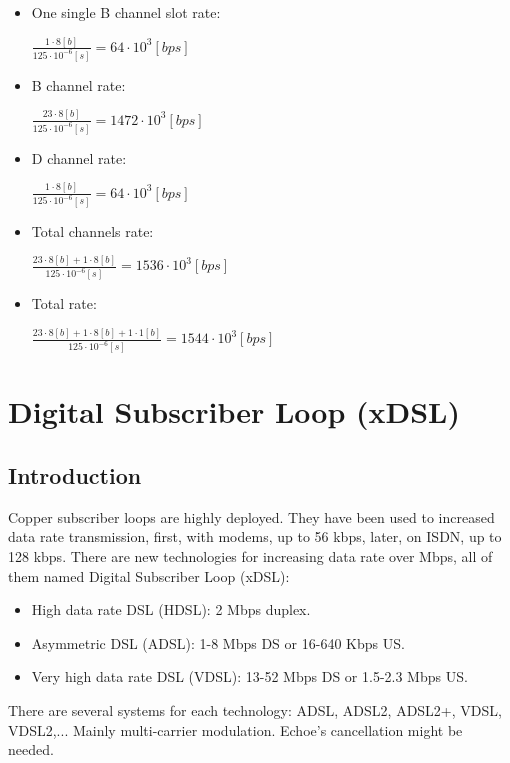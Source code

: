 \documentclass[
	12pt,
	twoside
]{book}
\begin{document}
\begin{itemize}
{\begin{itemize}
{				$
					\frac {1 \cdot 1 [b]} {125 \cdot 10^{-6} [s]} = 8 \cdot 10^3 [bps]
				$
			}
			\item {
				One single B channel slot rate:

				$
					\frac {1 \cdot 8 [b]} {125 \cdot 10^{-6} [s]} = 64 \cdot 10^3 [bps]
				$
			}
			\item {
				B channel rate:

				$
					\frac {23 \cdot 8 [b]} {125 \cdot 10^{-6} [s]} = 1472 \cdot 10^3 [bps]
				$
			}
			\item {
				D channel rate:

				$
					\frac {1 \cdot 8 [b]} {125 \cdot 10^{-6} [s]} = 64 \cdot 10^3 [bps]
				$
			}
			\item {
				Total channels rate:

				$
					\frac {23 \cdot 8 [b] + 1 \cdot 8 [b]} {125 \cdot 10^{-6} [s]} = 1536 \cdot 10^3 [bps]
				$
			}
			\item {
				Total rate:

				$
					\frac {23 \cdot 8 [b] + 1 \cdot 8 [b] + 1 \cdot 1 [b]} {125 \cdot 10^{-6} [s]} = 1544 \cdot 10^3 [bps]
				$
			}
		\end{itemize}
	}
\end{itemize}

\section{Digital Subscriber Loop (xDSL)}

\subsection{Introduction}

Copper subscriber loops are highly deployed. They have been used to increased data rate transmission, first, with modems, up to 56 kbps, later, on ISDN, up to 128 kbps. There are new technologies for increasing data rate over Mbps, all of them named Digital Subscriber Loop (xDSL):

\begin{itemize}
	\item High data rate DSL (HDSL): 2 Mbps duplex.
	\item Asymmetric DSL (ADSL): 1-8 Mbps DS or 16-640 Kbps US.
	\item Very high data rate DSL (VDSL): 13-52 Mbps DS or 1.5-2.3 Mbps US.
\end{itemize}

There are several systems for each technology: ADSL, ADSL2, ADSL2+, VDSL, VDSL2,... Mainly multi-carrier modulation. Echoe’s cancellation might be needed.
\end{document}
